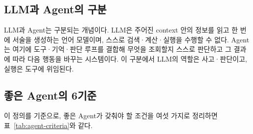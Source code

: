 \documentclass[11pt]{article}
\begin{document}
\subsection{LLM과 Agent의 구분}

LLM과 Agent는 구분되는 개념이다. LLM은 주어진 context 안의 정보를 읽고 한 번에 서술을 생성하는 언어 모델이며, 스스로 검색·계산·실행을 수행할 수 없다. Agent는 여기에 도구·기억·판단 루프를 결합해 무엇을 조회할지 스스로 판단하고 그 결과에 따라 다음 행동을 바꾸는 시스템이다. 이 구분에서 LLM의 역할은 사고·판단이고, 실행은 도구에 위임된다.

\subsection{좋은 Agent의 6기준}

이 정의를 기준으로, 좋은 Agent가 갖춰야 할 조건을 여섯 가지로 정리하면 표~\ref{tab:agent-criteria}와 같다.
\end{document}
